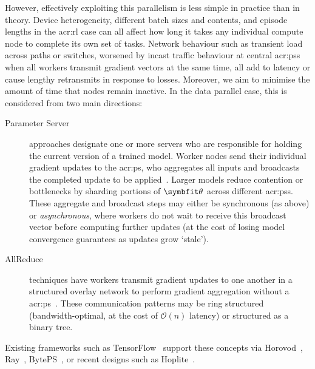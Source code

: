 
However, effectively exploiting this parallelism is less simple in practice than in theory.
Device heterogeneity, different batch sizes and contents, and episode lengths in the \gls{acr:rl} case can all affect how long it takes any individual compute node to complete its own set of tasks.
Network behaviour such as transient load across paths or switches, worsened by incast traffic behaviour at central \glspl{acr:ps} when all workers transmit gradient vectors at the same time, all add to latency or cause lengthy retransmits in response to losses.
Moreover, we aim to minimise the amount of time that nodes remain inactive.
In the data parallel case, this is considered from two main directions:
\begin{description}
	\item[Parameter Server] approaches designate one or more servers who are responsible for holding the current version of a trained model.
	Worker nodes send their individual gradient updates to the \gls{acr:ps}, who aggregates all inputs and broadcasts the completed update to be applied~\parencite{DBLP:conf/nips/DeanCMCDLMRSTYN12,DBLP:conf/osdi/LiAPSAJLSS14}.
	Larger models reduce contention or bottlenecks by sharding portions of $\wvec{}$ across different \glspl{acr:ps}.
	These aggregate and broadcast steps may either be synchronous (as above) or \emph{asynchronous}, where workers do not wait to receive this broadcast vector before computing further updates (at the cost of losing model convergence guarantees as updates grow `stale').
	
	\item[AllReduce] techniques have workers transmit gradient updates to one another in a structured overlay network to perform gradient aggregation without a \gls{acr:ps}~\parencite{DBLP:conf/cluster/MamidalaLP04,DBLP:conf/ipps/PatarasukY07}.
	These communication patterns may be ring structured (bandwidth-optimal, at the cost of $\mathcal{O}{\left(n\right)}$ latency) or structured as a binary tree.
\end{description}
Existing frameworks such as TensorFlow~\parencite{DBLP:journals/corr/AbadiABBCCCDDDG16} support these concepts via Horovod~\parencite{DBLP:journals/corr/abs-1802-05799}, Ray~\parencite{DBLP:conf/osdi/MoritzNWTLLEYPJ18}, BytePS~\parencite{DBLP:conf/osdi/JiangZLYCG20}, or recent designs such as Hoplite~\parencite{DBLP:conf/sigcomm/ZhuangLZWLNMS21}.

